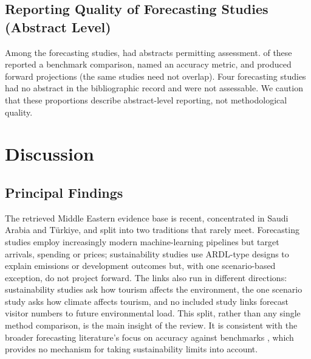 \documentclass[11pt,a4paper]{article}
\begin{document}
\subsection{Reporting Quality of Forecasting Studies (Abstract Level)}\label{sec:repquality}
Among the \NnF{} forecasting studies, \NFabs{} had abstracts permitting assessment. \NFbench{} of these reported a benchmark comparison, \NFmetric{} named an accuracy metric, and \NFfuture{} produced forward projections (the same studies need not overlap). Four forecasting studies had no abstract in the bibliographic record and were not assessable. We caution that these proportions describe abstract-level reporting, not methodological quality.

\section{Discussion}
\subsection{Principal Findings}
The retrieved Middle Eastern evidence base is recent, concentrated in Saudi Arabia and T\"urkiye, and split into two traditions that rarely meet. Forecasting studies employ increasingly modern machine-learning pipelines but target arrivals, spending or prices; sustainability studies use ARDL-type designs to explain emissions or development outcomes but, with one scenario-based exception, do not project forward. The links also run in different directions: sustainability studies ask how tourism affects the environment, the one scenario study asks how climate affects tourism, and no included study links forecast visitor numbers to future environmental load. This split, rather than any single method comparison, is the main insight of the review. It is consistent with the broader forecasting literature's focus on accuracy against benchmarks \citep{Makridakis2020,Makridakis2022}, which provides no mechanism for taking sustainability limits into account.
\end{document}
